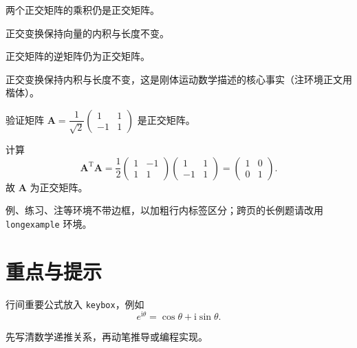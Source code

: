 \begin{proposition}
两个正交矩阵的乘积仍是正交矩阵。
\end{proposition}

\begin{lemma}[正交化的保持性]
正交变换保持向量的内积与长度不变。
\end{lemma}

\begin{corollary}
正交矩阵的逆矩阵仍为正交矩阵。
\end{corollary}

\begin{remark}
正交变换保持内积与长度不变，这是刚体运动数学描述的核心事实（注环境正文用楷体）。
\end{remark}

\begin{example}[求正交化验证]
验证矩阵 $\boldsymbol{A}=\dfrac{1}{\sqrt{2}}\begin{pmatrix}1 & 1\\ -1 & 1\end{pmatrix}$ 是正交矩阵。
\end{example}
\begin{solution}
计算
\[
	\boldsymbol{A}^{\mathrm{T}}\boldsymbol{A}
	=\frac12\begin{pmatrix}1 & -1\\ 1 & 1\end{pmatrix}
	\begin{pmatrix}1 & 1\\ -1 & 1\end{pmatrix}
	=\begin{pmatrix}1 & 0\\ 0 & 1\end{pmatrix}.
\]
故 $\boldsymbol{A}$ 为正交矩阵。
\end{solution}

\begin{note}
例、练习、注等环境不带边框，以加粗行内标签区分；跨页的长例题请改用 \texttt{longexample} 环境。
\end{note}

\section{重点与提示}
\begin{keybox}[必记结论]
行间重要公式放入 \texttt{keybox}，例如
\[
	e^{\mathrm{i}\theta}=\cos\theta+\mathrm{i}\sin\theta .
\]
\end{keybox}

\begin{tipbox}
先写清数学递推关系，再动笔推导或编程实现。
\end{tipbox}

